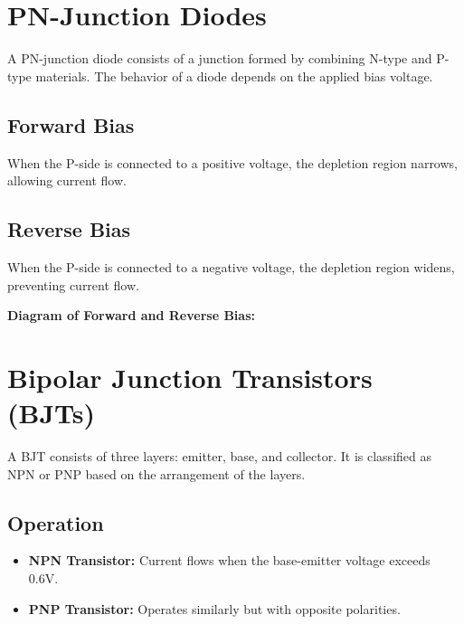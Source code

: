 \section*{PN-Junction Diodes}
A PN-junction diode consists of a junction formed by combining N-type and P-type materials. The behavior of a diode depends on the applied bias voltage.

\subsection*{Forward Bias}
When the P-side is connected to a positive voltage, the depletion region narrows, allowing current flow.

\subsection*{Reverse Bias}
When the P-side is connected to a negative voltage, the depletion region widens, preventing current flow.

\textbf{Diagram of Forward and Reverse Bias:}

\begin{center}
\end{center}

\section*{Bipolar Junction Transistors (BJTs)}
A BJT consists of three layers: emitter, base, and collector. It is classified as NPN or PNP based on the arrangement of the layers.

\subsection*{Operation}
\begin{itemize}
    \item \textbf{NPN Transistor:} Current flows when the base-emitter voltage exceeds 0.6V.
    \item \textbf{PNP Transistor:} Operates similarly but with opposite polarities.
\end{itemize}

